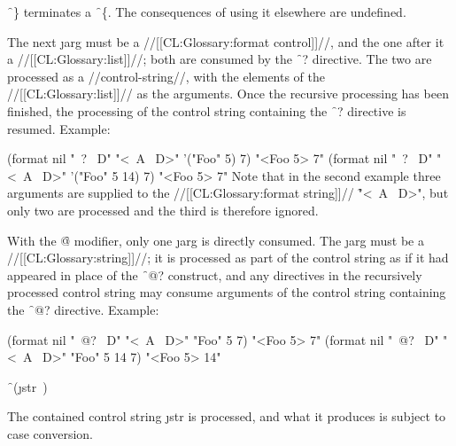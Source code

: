                                
\f{~\}} terminates a \f{~\{}.
The consequences of using it elsewhere are undefined.

\endsubsubsection%






The next \j{arg} must be a //[[CL:Glossary:format control]]//, and the one after it a //[[CL:Glossary:list]]//;
both are consumed by the \f{~?} directive.
The two are processed as a //control-string//, with the elements of the //[[CL:Glossary:list]]// 
as the arguments.  Once the recursive processing
has been finished, the processing of the control
string containing the \f{~?} directive is resumed.
Example:

\code
 (format nil "~? ~D" "<~A ~D>" '("Foo" 5) 7) \EV "<Foo 5> 7"
 (format nil "~? ~D" "<~A ~D>" '("Foo" 5 14) 7) \EV "<Foo 5> 7"
\endcode
Note that in the second example three arguments are supplied
to the //[[CL:Glossary:format string]]// \f{"<~A ~D>"}, but only two are processed
and the third is therefore ignored.


With the \f{@}
modifier, only one \j{arg} is directly consumed.
The \j{arg} must be a //[[CL:Glossary:string]]//; 
it is processed as part of the control
string as if it had appeared in place of the \f{~@?} construct,
and any directives in the recursively processed control string may      
consume arguments of the control string containing the \f{~@?}
directive.
Example:

\code
 (format nil "~@? ~D" "<~A ~D>" "Foo" 5 7) \EV "<Foo 5> 7"
 (format nil "~@? ~D" "<~A ~D>" "Foo" 5 14 7) \EV "<Foo 5> 14"
\endcode

\endsubsubsection%

\endsubsection%




\f{~(\j{str}~)}

The contained control string \j{str} is processed, and what it produces
is subject to case conversion.



